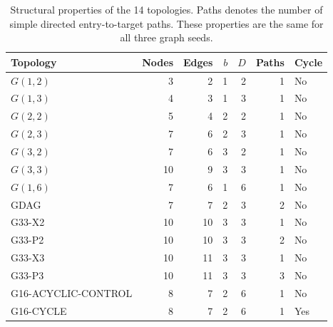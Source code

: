 \begin{table}[!htbp]
\centering
\caption{Structural properties of the 14 topologies. Paths denotes the number of simple directed entry-to-target paths. These properties are the same for all three graph seeds.}
\label{tab:topology-configurations}
\small
\begin{tabular}{@{}lrrrrrl@{}}
\toprule
Topology & Nodes & Edges & \(b\) & \(D\) & Paths & Cycle \\
\midrule
\(G(1,2)\) & 3 & 2 & 1 & 2 & 1 & No \\
\(G(1,3)\) & 4 & 3 & 1 & 3 & 1 & No \\
\(G(2,2)\) & 5 & 4 & 2 & 2 & 1 & No \\
\(G(2,3)\) & 7 & 6 & 2 & 3 & 1 & No \\
\(G(3,2)\) & 7 & 6 & 3 & 2 & 1 & No \\
\(G(3,3)\) & 10 & 9 & 3 & 3 & 1 & No \\
\(G(1,6)\) & 7 & 6 & 1 & 6 & 1 & No \\
GDAG & 7 & 7 & 2 & 3 & 2 & No \\
\midrule
G33-X2 & 10 & 10 & 3 & 3 & 1 & No \\
G33-P2 & 10 & 10 & 3 & 3 & 2 & No \\
G33-X3 & 10 & 11 & 3 & 3 & 1 & No \\
G33-P3 & 10 & 11 & 3 & 3 & 3 & No \\
\midrule
G16-ACYCLIC-CONTROL & 8 & 7 & 2 & 6 & 1 & No \\
G16-CYCLE & 8 & 7 & 2 & 6 & 1 & Yes \\
\bottomrule
\end{tabular}
\end{table}
